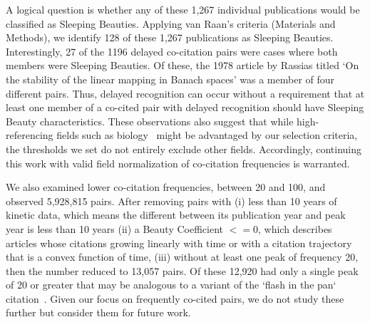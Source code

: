 \documentclass[utf8]{frontiersSCNS}
\begin{document}
A logical question is whether any of these 1,267 individual publications would be classified as Sleeping Beauties. Applying van Raan's criteria (Materials and Methods), we identify 128 of these 1,267 publications as Sleeping Beauties. Interestingly, 27 of the 1196 delayed co-citation pairs were cases where both members were Sleeping Beauties. Of these, the 1978 article by Rassias titled `On the stability of the linear mapping in Banach spaces' was a member of four different pairs. Thus, delayed recognition can occur without a requirement that at least one member of a co-cited pair with delayed recognition should have Sleeping Beauty characteristics. These  observations also suggest that while high-referencing fields such as biology~\citep{Small1980} might be advantaged by our selection criteria, the thresholds we set do not entirely exclude other fields. Accordingly, continuing this work with valid field normalization of co-citation frequencies is warranted.

We also examined lower co-citation frequencies, between 20 and 100, and observed 5,928,815 pairs. After removing pairs with (i) less than 10 years of kinetic data, which means the different between its publication year and peak year is less than 10 years (ii) a Beauty Coefficient $<=0$, which describes articles whose citations growing linearly with time or with a citation trajectory that is a convex function of time, (iii) without at least one peak of frequency 20, then the number reduced to 13,057 pairs. Of these 12,920 had only a single peak of 20 or greater that may be analogous to a variant of the `flash in the pan` citation~\citep{Li2013CitationCO,ye_bornmann_2018}. Given our focus on frequently co-cited pairs, we do not study these further but consider them for future work.
\end{document}

